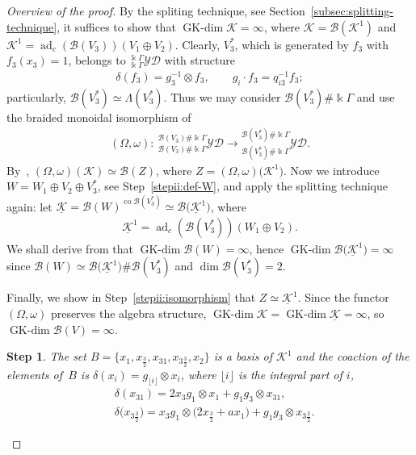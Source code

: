 \documentclass[pdftex]{sigma}
\numberwithin{equation}{section}
\newtheorem{stepii}{Step}
\newcommand{\adc}{\operatorname{ad}_c}
\newcommand{\co}{\operatorname{co}}
\newcommand{\GK}{\operatorname{GK-dim}}
\newcommand{\toba}{\mathscr B}
\newcommand{\K}{{\mathcal{K}}}
\newcommand{\Ku}{\underline{\mathcal K}}
\newcommand{\yd}[1]{{}_{#1}^{#1}\mathcal{YD}}
\newcommand{\tresdos}{\frac{3}{2}}
\begin{document}
\begin{proof}[Overview of the proof]
By the spliting technique, see Section~\ref{subsec:splitting-technique}, it suffices to
show that $\GK \K = \infty$, where $\K = \toba\left( \K^1 \right)$ and $\K^1 = \adc(\toba(V_3))(V_1 \oplus V_2)$.
Clearly, $V_3^*$, which is generated by $f_3$ with $f_3(x_3)=1$, belongs to $\yd{\Bbbk\Gamma}$ with structure
\begin{align*}
\delta(f_3)=g_3^{-1}\otimes f_3, \qquad g_i\cdot f_3=q_{i3}^{-1}f_3;
\end{align*}
particularly, $\toba(V_3^*) \simeq \Lambda (V_3^*)$.
Thus we may consider $\toba(V_3^*)\#\Bbbk \Gamma$ and use the braided monoidal isomorphism of~\cite[Remark~12.3.8]{HS-book}
\begin{align*}
(\Omega,\omega)\colon\ \yd{\toba(V_3)\#\Bbbk \Gamma}\to \yd{\toba(V_3^*)\#\Bbbk \Gamma}.
\end{align*}
By~\cite[Corollary~12.3.9]{HS-book}, $(\Omega,\omega)(\K)\simeq \toba(Z)$, where $Z=(\Omega,\omega)\big(\K^1\big)$.
Now we introduce $W=W_1\oplus V_2\oplus V_3^*$, see Step~\ref{stepii:def-W}, and apply the splitting technique again:
let $\Ku = \toba\left(W\right)^{\co \toba(V_3^*)} \simeq \toba \big(\Ku^1\big)$, where
\begin{align*}
\Ku^1=\adc(\toba(V_3^*))(W_1 \oplus V_2).
\end{align*}
We shall derive from \cite[Lemma 5.4.11]{AAH-triang} that $\GK\toba(W)=\infty$, hence $\GK \toba\big(\Ku^1\big)=\infty$ since
$\toba(W) \simeq \toba\big(\Ku^1\big) \# \toba(V_3^*)$ and $\dim \toba(V_3^*)=2$.

Finally, we show in Step~\ref{stepii:isomorphism} that $Z\simeq \Ku^1$.
Since the functor $(\Omega,\omega)$ preserves the algebra structure,
$\GK \K=\GK\Ku=\infty$, so $\GK\toba(V)=\infty$.

\begin{stepii}\label{stepii:base1}
The set $B=\big\{x_1,x_{\tresdos},x_{31},x_{3\tresdos},x_2\big\}$ is a basis of $\K^1$
and the coaction of the elements of~$B$ is $\delta(x_i) = g_{\lfloor i\rfloor}\otimes x_i$,
where $\lfloor i\rfloor$ is the integral part of $i$,
\begin{align*}
&\delta(x_{31}) = 2x_3g_1 \otimes x_1 + g_1g_3 \otimes x_{31},
\\
&\delta\big(x_{3\tresdos}\big) = x_3g_1 \otimes \big(2x_{\tresdos}+ax_1\big) + g_1g_3 \otimes x_{3\tresdos}.
\end{align*}
\end{stepii}


\end{proof}
\end{document}
